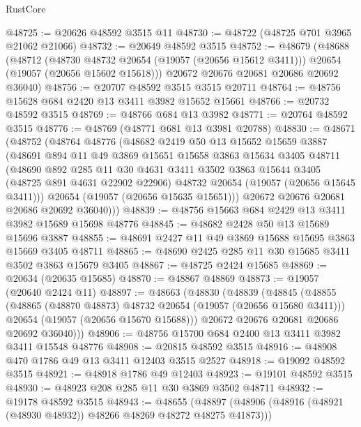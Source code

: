 \begin{lexlean}{RustCore}
\begin{coremodule}
@48725 := @20626 @48592 @3515 @11
@48730 := @48722 (@48725 @701 @3965 @21062 @21066)
@48732 := @20649 @48592 @3515
@48752 := @48679
    (@48688
      (@48712
        (@48730 @48732 @20654 (@19057 (@20656 @15612 @3411)))
        @20654
        (@19057 (@20656 @15602 @15618)))
      @20672
      @20676
      @20681
      @20686
      @20692
      @36040)
@48756 := @20707 @48592 @3515 @3515 @20711
@48764 := @48756 @15628 @684 @2420 @13 @3411 @3982 @15652 @15661
@48766 := @20732 @48592 @3515
@48769 := @48766 @684 @13 @3982
@48771 := @20764 @48592 @3515
@48776 := @48769 (@48771 @681 @13 @3981 @20788)
@48830 := @48671
    (@48752
      (@48764
        @48776
        (@48682
          @2419
          @50
          @13
          @15652
          @15659
          @3887
          (@48691
            @894
            @11
            @49
            @3869
            @15651
            @15658
            @3863
            @15634
            @3405
            @48711
            (@48690
              @892
              @285
              @11
              @30
              @4631
              @3411
              @3502
              @3863
              @15644
              @3405
              (@48725 @891 @4631 @22902 @22906)
              @48732
              @20654
              (@19057 (@20656 @15645 @3411)))
            @20654
            (@19057 (@20656 @15635 @15651)))
          @20672
          @20676
          @20681
          @20686
          @20692
          @36040)))
@48839 := @48756 @15663 @684 @2429 @13 @3411 @3982 @15689 @15698 @48776
@48845 := @48682 @2428 @50 @13 @15689 @15696 @3887
@48855 := @48691 @2427 @11 @49 @3869 @15688 @15695 @3863 @15669 @3405 @48711
@48865 := @48690 @2425 @285 @11 @30 @15685 @3411 @3502 @3863 @15679 @3405
@48867 := @48725 @2424 @15685
@48869 := @20634 (@20635 @15685)
@48870 := @48867 @48869
@48873 := @19057 (@20640 @2424 @11)
@48897 := @48663
    (@48830
      (@48839
        (@48845
          (@48855
            (@48865 (@48870 @48873) @48732 @20654 (@19057 (@20656 @15680 @3411)))
            @20654
            (@19057 (@20656 @15670 @15688)))
          @20672
          @20676
          @20681
          @20686
          @20692
          @36040)))
@48906 := @48756 @15700 @684 @2400 @13 @3411 @3982 @3411 @15548 @48776
@48908 := @20815 @48592 @3515
@48916 := @48908 @470 @1786 @49 @13 @3411 @12403 @3515 @2527
@48918 := @19092 @48592 @3515
@48921 := @48918 @1786 @49 @12403
@48923 := @19101 @48592 @3515
@48930 := @48923 @208 @285 @11 @30 @3869 @3502 @48711
@48932 := @19178 @48592 @3515
@48943 := @48655
    (@48897 (@48906 (@48916 (@48921 (@48930 @48932)) @48266 @48269 @48272 @48275 @41873)))

\end{coremodule}
\end{lexlean}
